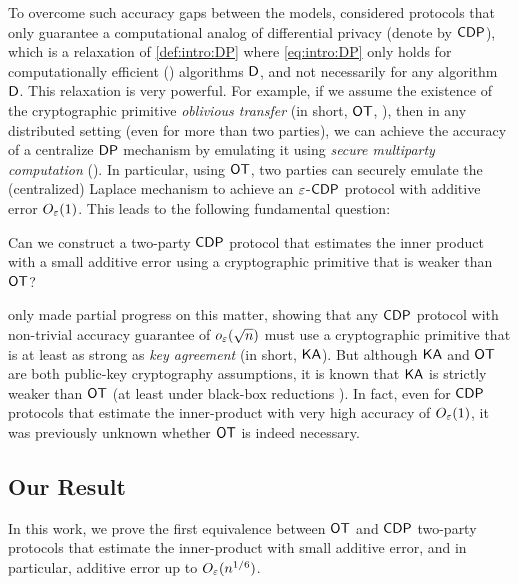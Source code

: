 To overcome such accuracy gaps between the models, \cite{BNO08,MPRV09} considered protocols that only guarantee a computational analog of differential privacy (denote by ${\sf CDP}$), which is a relaxation of \cref{def:intro:DP} where \cref{eq:intro:DP} only holds for computationally efficient (\ppt) algorithms $\mathsf{D}$, and not necessarily for any algorithm $\mathsf{D}$. This relaxation is very powerful. For example, if we assume the existence of the cryptographic primitive \emph{oblivious transfer} (in short, ${\sf OT}$, \cite{Rabin81}), then in any distributed setting (even for more than two parties), we can achieve the accuracy of a centralize ${\sf DP}$ mechanism by emulating it using \emph{secure multiparty computation} (\cite{BNO08,DKMMN06}). In particular, using ${\sf OT}$, two parties can securely emulate the (centralized) Laplace mechanism to achieve an $\varepsilon$-${\sf CDP}$ protocol with additive error $O_{\varepsilon}(1)$. This leads to the following fundamental question:

\begin{question}
	Can we construct a two-party ${\sf CDP}$ protocol that estimates the inner product with a small additive error using a cryptographic primitive that is weaker than ${\sf OT}$? 
\end{question}



\cite{HaitnerMST22} only made partial progress on this matter, showing that any ${\sf CDP}$ protocol with non-trivial accuracy guarantee of $o_{\varepsilon}(\sqrt{n})$ must use a cryptographic primitive that is at least as strong as \emph{key agreement} (in short, ${\sf KA}$).  But although ${\sf KA}$ and ${\sf OT}$ are both public-key cryptography assumptions, it is known that ${\sf KA}$ is strictly weaker than ${\sf OT}$ (at least under black-box reductions \cite{GertnerKMRV00}).
In fact, even for ${\sf CDP}$ protocols that estimate the inner-product with very high accuracy of $O_{\varepsilon}(1)$, it was previously unknown whether ${\sf OT}$ is indeed necessary.


\subsection{Our Result}

In this work, we prove the first equivalence between ${\sf OT}$ and ${\sf CDP}$ two-party protocols that estimate the inner-product with small additive error, and in particular, additive error up to $O_{\varepsilon}(n^{1/6})$.

